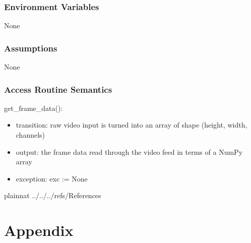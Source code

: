 \documentclass[12pt, titlepage]{article}
\begin{document}
\subsubsection{Environment Variables}
None
\subsubsection{Assumptions}
None
\subsubsection{Access Routine Semantics}
get\_frame\_data():
\begin{itemize}
    \item transition: raw video input is turned into an array of shape (height, width, channels)
    \item output: the frame data read through the video feed in terms of a NumPy array
    \item exception: exc := None
\end{itemize}


\newpage

 {plainnat}
 {../../../refs/References}

\newpage

\section{Appendix} \label{Appendix}

\end{document}
